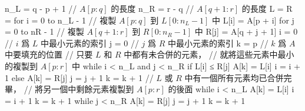 \startCLRSCODE
n_{L} = q - p + 1	// $A[p : q]$ 的長度
n_{R} = r - q		// $A[q + 1 : r]$ 的長度
L = 
R = 
for i = 0 to n_L - 1	// 複製 $A[p : q]$ 到 $L[0 : n_L - 1]$ 中
	L[i] = A[p + i]
for j = 0 to nR - 1	// 複製 $A[q + 1 : r]$ 到 $R[0 : n_R - 1]$ 中
	R[j] = A[q + j + 1]
i = 0	// $i$ 爲 $L$ 中最小元素的索引
j = 0	// $j$ 爲 $R$ 中最小元素的索引
k = p	// $k$ 爲 $A$ 中要填充的位置
// 只要 $L$ 和 $R$ 中都有未合併的元素，
// 就將這些元素中最小的複製到 $A[p : r]$ 中
while i < n_L and j < n_R
	if L[i] ≤ R[j]
		A[k] = L[i]
		i = i + 1
	else
		A[k] = R[j]
		j = j + 1
	k = k + 1
// $L$ 或 $R$ 中有一個所有元素均已合併完畢，
// 將另一個中剩餘元素複製到 $A[p : r]$ 的後面
while i < n_L
	A[k] = L[i]
	i = i + 1
	k = k + 1
while j < n_R
	A[k] = R[j]
	j = j + 1
	k = k + 1
\stopCLRSCODE
